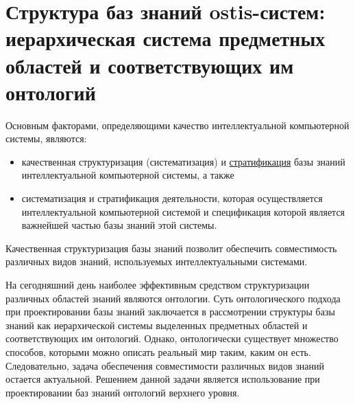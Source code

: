 \chapter{Структура баз знаний ostis-систем: иерархическая система предметных областей и соответствующих им онтологий}
\label{chapter_kb}


Основным факторами, определяющими качество интеллектуальной компьютерной системы, являются:
	\begin{itemize}
		\item {качественная структуризация (систематизация) и \uline{стратификация} базы знаний интеллектуальной 		компьютерной системы, а также}
		\item {систематизация и стратификация деятельности, которая осуществляется интеллектуальной компьютерной системой и спецификация которой является важнейшей частью базы знаний этой системы.}
	\end{itemize}

Качественная структуризация базы знаний позволит обеспечить совместимость различных видов знаний, используемых интеллектуальными системами.  

На сегодняшний день наиболее эффективным средством структуризации различных областей знаний являются онтологии. Суть онтологического подхода при проектировании базы знаний заключается в рассмотрении структуры базы знаний как иерархической системы выделенных предметных областей и соответствующих им онтологий. Однако, онтологически существует множество способов, которыми можно описать реальный мир таким, каким он есть. Следовательно, задача обеспечения совместимости различных видов знаний остается актуальной. Решением данной задачи является использование при проектировании баз знаний онтологий верхнего уровня.

\begin{SCn}
\end{SCn}

